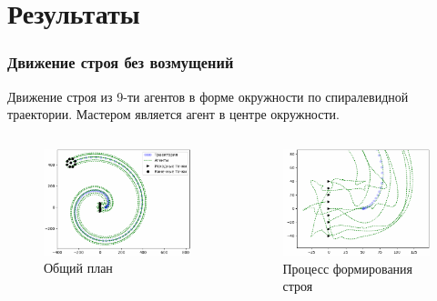 \documentclass[10pt]{beamer}
\begin{document}
\section{Результаты}
\begin{frame}
	\frametitle{Движение строя без возмущений}
	Движение строя из 9-ти агентов в форме окружности по спиралевидной траектории. Мастером является агент в центре окружности.
	\begin{columns}
		\begin{figure}
			\centering
			\includegraphics[width=1\linewidth]{others/circle-platoon}
			\caption{Общий план}
			\label{fig:circle-platoon}
		\end{figure}
		\begin{figure}
			\centering
			\includegraphics[width=1\linewidth]{others/circle-platoon-zoom1}
			\caption{Процесс формирования строя}
			\label{fig:circle-platoon-zoom1}
		\end{figure}
	\end{columns}
\end{frame}
\end{document}
